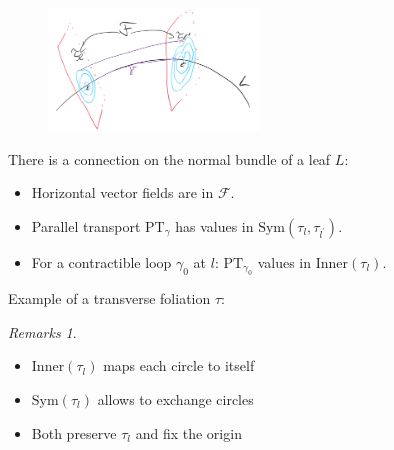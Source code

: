 \documentclass[hyperref={pdfpagelabels=false}]{beamer}
\theoremstyle{plain}
\theoremstyle{remark}
\newtheorem*{remark}{Remarks}
\begin{document}
\begin{frame}
\begin{figure}[htbp]
	\centering
		\includegraphics[width=0.50\textwidth]{Foliation connection.png}
	\label{fig:FoliationconnectionZwei}
\end{figure}

\begin{theorem}
There is a connection on the normal bundle of a leaf $L$:
\begin{itemize}
	\item Horizontal vector fields are in $\mathcal{F}$.
	\item Parallel transport $\mathup{PT}_\gamma$ has values in $\mathup{Sym}(\tau_l, \tau_{l^\prime})$.
	\item For a contractible loop $\gamma_0$ at $l$: $\mathup{PT}_{\gamma_0}$ values in $\mathup{Inner}(\tau_l)$.
\end{itemize}
\end{theorem}

\end{frame}

{
\begin{frame}{Example of a transverse foliation $\tau$:}
\begin{minipage}[]{0.45\textwidth}
\begin{figure}
\end{figure}
\end{minipage}
\hfill
\begin{minipage}[]{0.45\textwidth}
\begin{remark}
\begin{itemize}
	\item $\mathup{Inner}(\tau_l)$ maps each circle to itself
	\item $\mathup{Sym}(\tau_l)$ allows to exchange circles
	\item Both preserve $\tau_l$ and fix the origin
\end{itemize}
\end{remark}
\end{minipage}
\end{frame}
}
\end{document}
